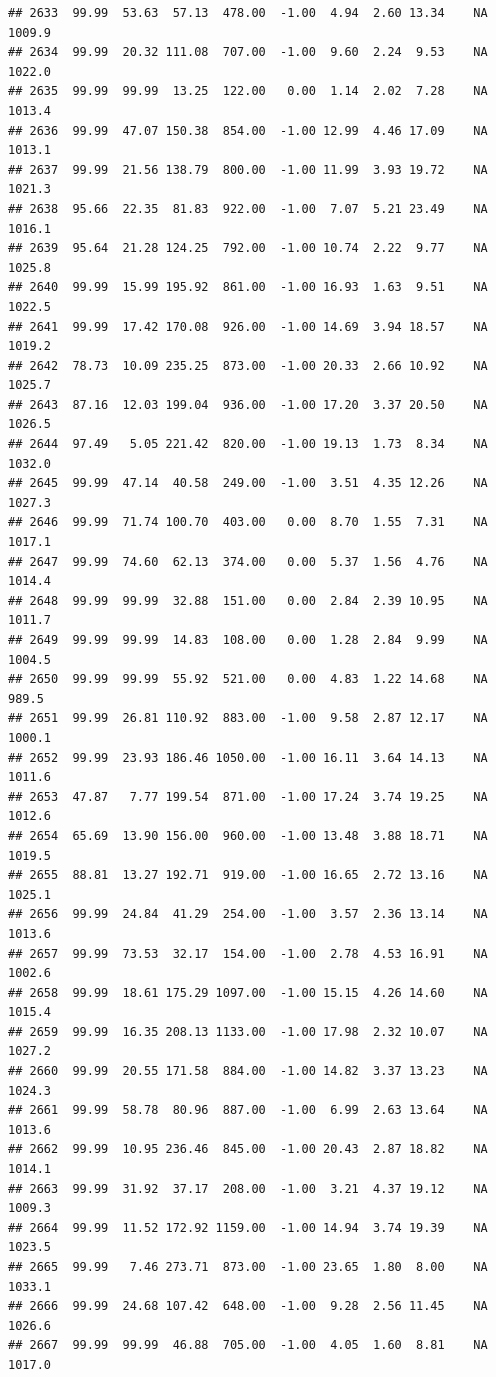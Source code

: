 \documentclass{article}\usepackage{graphicx, color}
\makeatletter
\newenvironment{kframe}{%
 \def\at@end@of@kframe{}%
 \ifinner\ifhmode%
  \def\at@end@of@kframe{\end{minipage}}%
  \begin{minipage}{\columnwidth}%
 \fi\fi%
 \def\FrameCommand##1{\hskip\@totalleftmargin \hskip-\fboxsep
 \colorbox{shadecolor}{##1}\hskip-\fboxsep
     \hskip-\linewidth \hskip-\@totalleftmargin \hskip\columnwidth}%
 \MakeFramed {\advance\hsize-\width
   \@totalleftmargin\z@ \linewidth\hsize
   \@setminipage}}%
 {\par\unskip\endMakeFramed%
 \at@end@of@kframe}
\newenvironment{knitrout}{}{} %
\makeatother
\begin{document}
\begin{knitrout}
\begin{kframe}
\begin{verbatim}
## 2633  99.99  53.63  57.13  478.00  -1.00  4.94  2.60 13.34    NA 1009.9
## 2634  99.99  20.32 111.08  707.00  -1.00  9.60  2.24  9.53    NA 1022.0
## 2635  99.99  99.99  13.25  122.00   0.00  1.14  2.02  7.28    NA 1013.4
## 2636  99.99  47.07 150.38  854.00  -1.00 12.99  4.46 17.09    NA 1013.1
## 2637  99.99  21.56 138.79  800.00  -1.00 11.99  3.93 19.72    NA 1021.3
## 2638  95.66  22.35  81.83  922.00  -1.00  7.07  5.21 23.49    NA 1016.1
## 2639  95.64  21.28 124.25  792.00  -1.00 10.74  2.22  9.77    NA 1025.8
## 2640  99.99  15.99 195.92  861.00  -1.00 16.93  1.63  9.51    NA 1022.5
## 2641  99.99  17.42 170.08  926.00  -1.00 14.69  3.94 18.57    NA 1019.2
## 2642  78.73  10.09 235.25  873.00  -1.00 20.33  2.66 10.92    NA 1025.7
## 2643  87.16  12.03 199.04  936.00  -1.00 17.20  3.37 20.50    NA 1026.5
## 2644  97.49   5.05 221.42  820.00  -1.00 19.13  1.73  8.34    NA 1032.0
## 2645  99.99  47.14  40.58  249.00  -1.00  3.51  4.35 12.26    NA 1027.3
## 2646  99.99  71.74 100.70  403.00   0.00  8.70  1.55  7.31    NA 1017.1
## 2647  99.99  74.60  62.13  374.00   0.00  5.37  1.56  4.76    NA 1014.4
## 2648  99.99  99.99  32.88  151.00   0.00  2.84  2.39 10.95    NA 1011.7
## 2649  99.99  99.99  14.83  108.00   0.00  1.28  2.84  9.99    NA 1004.5
## 2650  99.99  99.99  55.92  521.00   0.00  4.83  1.22 14.68    NA  989.5
## 2651  99.99  26.81 110.92  883.00  -1.00  9.58  2.87 12.17    NA 1000.1
## 2652  99.99  23.93 186.46 1050.00  -1.00 16.11  3.64 14.13    NA 1011.6
## 2653  47.87   7.77 199.54  871.00  -1.00 17.24  3.74 19.25    NA 1012.6
## 2654  65.69  13.90 156.00  960.00  -1.00 13.48  3.88 18.71    NA 1019.5
## 2655  88.81  13.27 192.71  919.00  -1.00 16.65  2.72 13.16    NA 1025.1
## 2656  99.99  24.84  41.29  254.00  -1.00  3.57  2.36 13.14    NA 1013.6
## 2657  99.99  73.53  32.17  154.00  -1.00  2.78  4.53 16.91    NA 1002.6
## 2658  99.99  18.61 175.29 1097.00  -1.00 15.15  4.26 14.60    NA 1015.4
## 2659  99.99  16.35 208.13 1133.00  -1.00 17.98  2.32 10.07    NA 1027.2
## 2660  99.99  20.55 171.58  884.00  -1.00 14.82  3.37 13.23    NA 1024.3
## 2661  99.99  58.78  80.96  887.00  -1.00  6.99  2.63 13.64    NA 1013.6
## 2662  99.99  10.95 236.46  845.00  -1.00 20.43  2.87 18.82    NA 1014.1
## 2663  99.99  31.92  37.17  208.00  -1.00  3.21  4.37 19.12    NA 1009.3
## 2664  99.99  11.52 172.92 1159.00  -1.00 14.94  3.74 19.39    NA 1023.5
## 2665  99.99   7.46 273.71  873.00  -1.00 23.65  1.80  8.00    NA 1033.1
## 2666  99.99  24.68 107.42  648.00  -1.00  9.28  2.56 11.45    NA 1026.6
## 2667  99.99  99.99  46.88  705.00  -1.00  4.05  1.60  8.81    NA 1017.0

\end{verbatim}
\end{kframe}
\end{knitrout}
\end{document}
